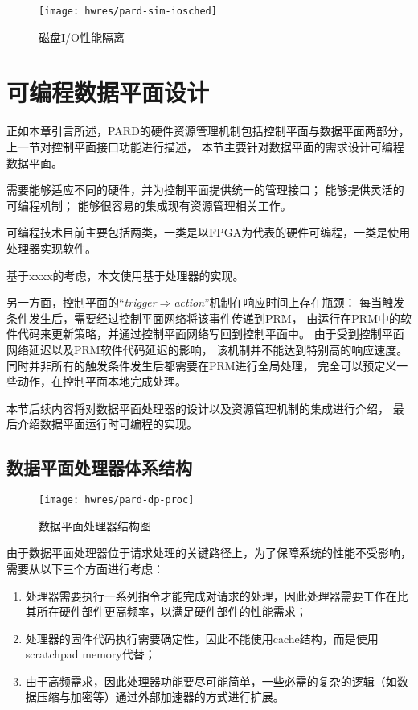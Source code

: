 \begin{figure}[tb]
  \centering
  \texttt{[image: hwres/pard-sim-iosched]}
  \caption{磁盘I/O性能隔离}
  \label{fig:pardsim:iosched}
\end{figure}


\section{可编程数据平面设计}
\label{chap:hwresman:dp}

正如本章引言所述，PARD的硬件资源管理机制包括控制平面与数据平面两部分，上一节对控制平面接口功能进行描述，
本节主要针对数据平面的需求设计可编程数据平面。

需要能够适应不同的硬件，并为控制平面提供统一的管理接口；
能够提供灵活的可编程机制；
能够很容易的集成现有资源管理相关工作。

可编程技术目前主要包括两类，一类是以FPGA为代表的硬件可编程，一类是使用处理器实现软件。

基于xxxx的考虑，本文使用基于处理器的实现。

另一方面，控制平面的``\emph{trigger$\Rightarrow$action}''机制在响应时间上存在瓶颈：
每当触发条件发生后，需要经过控制平面网络将该事件传递到PRM，
由运行在PRM中的软件代码来更新策略，并通过控制平面网络写回到控制平面中。
由于受到控制平面网络延迟以及PRM软件代码延迟的影响，
该机制并不能达到特别高的响应速度。
同时并非所有的触发条件发生后都需要在PRM进行全局处理，
完全可以预定义一些动作，在控制平面本地完成处理。

本节后续内容将对数据平面处理器的设计以及资源管理机制的集成进行介绍，
最后介绍数据平面运行时可编程的实现。

\subsection{数据平面处理器体系结构}

\begin{figure}[tb]
  \centering
  \texttt{[image: hwres/pard-dp-proc]}
  \caption{数据平面处理器结构图}
  \label{fig:pard-dp-proc}
\end{figure}

由于数据平面处理器位于请求处理的关键路径上，为了保障系统的性能不受影响，需要从以下三个方面进行考虑：

\begin{enumerate}[leftmargin=2\parindent, nolistsep, label=\arabic*）]
  \item 处理器需要执行一系列指令才能完成对请求的处理，因此处理器需要工作在比其所在硬件部件更高频率，以满足硬件部件的性能需求；
  \item 处理器的固件代码执行需要确定性，因此不能使用cache结构，而是使用scratchpad memory代替；
  \item 由于高频需求，因此处理器功能要尽可能简单，一些必需的复杂的逻辑（如数据压缩与加密等）通过外部加速器的方式进行扩展。
\end{enumerate}

